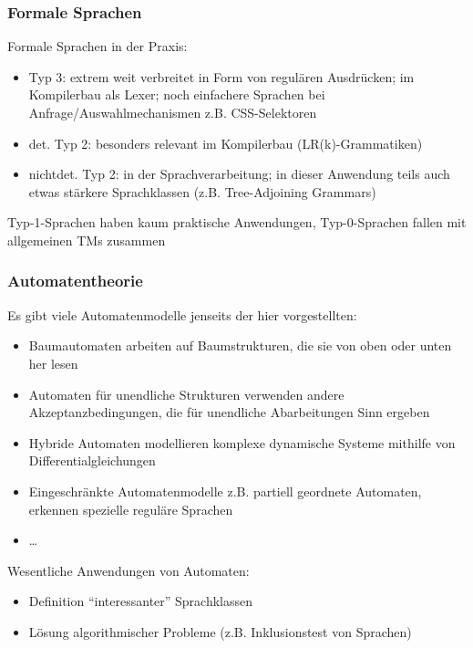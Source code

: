 \documentclass[onlymath]{beamer}
\begin{document}
\begin{frame}\frametitle{Formale Sprachen}

Formale Sprachen in der Praxis:
\begin{itemize}
\item Typ 3: extrem weit verbreitet in Form von regulären Ausdrücken; im \alert{Kompilerbau} als Lexer; noch einfachere Sprachen bei Anfrage/Auswahlmechanismen z.B. CSS-Selektoren
\item det. Typ 2: besonders relevant im \alert{Kompilerbau} (LR(k)-Grammatiken)
\item nichtdet. Typ 2: in der \alert{Sprachverarbeitung}; in dieser Anwendung teils auch etwas stärkere Sprachklassen (z.B. Tree-Adjoining Grammars)
\end{itemize}
Typ-1-Sprachen haben kaum praktische Anwendungen, Typ-0-Sprachen fallen mit allgemeinen TMs zusammen

\end{frame}


\begin{frame}\frametitle{Automatentheorie}

Es gibt viele Automatenmodelle jenseits der hier vorgestellten:
\begin{itemize}
\item \alert{Baumautomaten} arbeiten auf Baumstrukturen, die sie von oben oder unten her lesen
\item \alert{Automaten für unendliche Strukturen} verwenden andere Akzeptanzbedingungen, die für unendliche Abarbeitungen Sinn ergeben
\item \alert{Hybride Automaten} modellieren komplexe dynamische Systeme mithilfe von Differentialgleichungen
\item \alert{Eingeschränkte Automatenmodelle} z.B. partiell geordnete Automaten, erkennen spezielle reguläre Sprachen
\item \ldots
\end{itemize}
Wesentliche Anwendungen von Automaten:
\begin{itemize}
\item Definition "`interessanter"' Sprachklassen
\item Lösung algorithmischer Probleme (z.B. Inklusionstest von Sprachen)
\end{itemize}

\end{frame}
\end{document}
